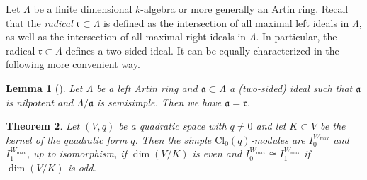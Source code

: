 \documentclass[a4paper, twoside, 11pt]{amsart}
\newtheorem{theorem}{Theorem}[section]
\newtheorem{lemma}[theorem]{Lemma}
\theoremstyle{definition}
\theoremstyle{remark}
\numberwithin{equation}{theorem}
\newcommand{\wmax}{W_{\text{max}}}
\newcommand{\evencl}{\mathrm{Cl}_0}
\begin{document}
Let $\Lambda$ be a finite dimensional $k$-algebra or more generally an Artin ring. Recall that the \textit{radical} $\mathfrak{r} \subset \Lambda$ is defined as the intersection of all maximal left ideals in $\Lambda$, as well as the intersection of all maximal right ideals in $\Lambda$. In particular, the radical $\mathfrak{r} \subset \Lambda$ defines a two-sided ideal.
It can be equally characterized in the following more convenient way.
\begin{lemma}[{\cite[Proposition 3.3]{auslander}}]\label{radical}
    Let $\Lambda$ be a left Artin ring and $\mathfrak{a}\subset \Lambda$ a (two-sided) ideal such that $\mathfrak{a}$ is nilpotent and $\Lambda/\mathfrak{a}$ is semisimple. Then we have $\mathfrak{a} = \mathfrak{r}$.
\end{lemma}
\begin{theorem}\label{simples_degenerate}
    Let $(V,q)$ be a quadratic space with $q\neq 0$ and let $K \subset V$ be the kernel of the quadratic form $q$. Then the simple $\evencl(q)$-modules are $I_0^{\wmax}$ and $ I_1^{\wmax}$, up to isomorphism, if $\dim(V/K)$ is even and $I_0^{\wmax} \cong I_1^{\wmax}$ if $\dim(V/K)$ is odd. 
\end{theorem}
\end{document}
